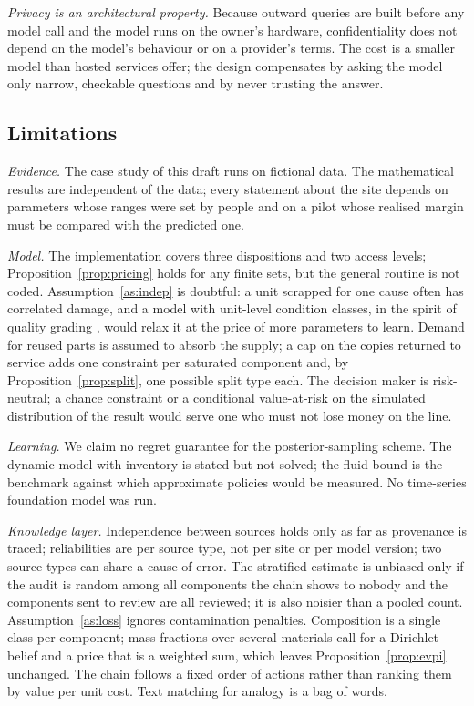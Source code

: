 \emph{Privacy is an architectural property.} Because outward queries are built before any model call and the model
runs on the owner's hardware, confidentiality does not depend on the model's behaviour or on a provider's terms.
The cost is a smaller model than hosted services offer; the design compensates by asking the model only narrow,
checkable questions and by never trusting the answer.

\subsection{Limitations}

\emph{Evidence.} \ifnum{}\relax The case study of this draft runs on fictional data. \fi The
mathematical results are independent of the data; every statement about the site depends on parameters whose
ranges were set by people and on a pilot whose realised margin must be compared with the predicted one.

\emph{Model.} The implementation covers three dispositions and two access levels;
Proposition~\ref{prop:pricing} holds for any finite sets, but the general routine is not coded.
Assumption~\ref{as:indep} is doubtful: a unit scrapped for one cause often has correlated damage, and a model with
unit-level condition classes, in the spirit of quality grading \citep{ferguson2009}, would relax it at the price of
more parameters to learn. Demand for reused parts is assumed to absorb the supply; a cap on the copies returned to
service adds one constraint per saturated component and, by Proposition~\ref{prop:split}, one possible split type
each. The decision maker is risk-neutral; a chance constraint or a conditional value-at-risk on the simulated
distribution of the result would serve one who must not lose money on the line.

\emph{Learning.} We claim no regret guarantee for the posterior-sampling scheme. The dynamic model with inventory
is stated but not solved; the fluid bound is the benchmark against which approximate policies would be measured.
No time-series foundation model was run.

\emph{Knowledge layer.} Independence between sources holds only as far as provenance is traced; reliabilities are
per source type, not per site or per model version; two source types can share a cause of error. The stratified
estimate is unbiased only if the audit is random among all components the chain shows to nobody and the components
sent to review are all reviewed; it is also noisier than a pooled count.
Assumption~\ref{as:loss} ignores contamination penalties. Composition is a single class per component; mass
fractions over several materials call for a Dirichlet belief and a price that is a weighted sum, which leaves
Proposition~\ref{prop:evpi} unchanged. The chain follows a fixed order of actions rather than ranking them by value
per unit cost. Text matching for analogy is a bag of words.

